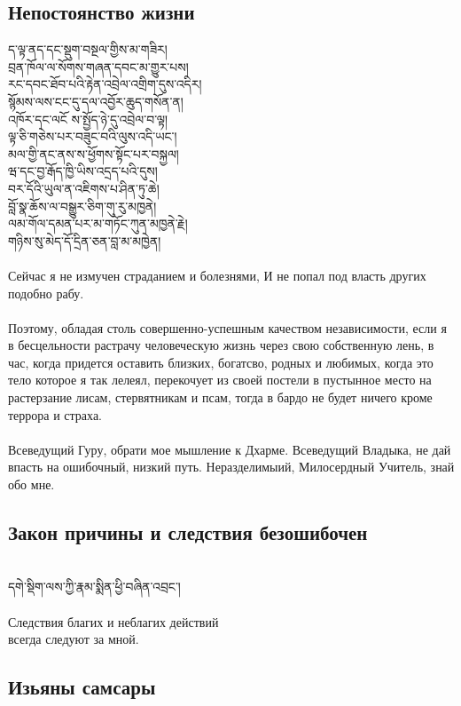 \subsection{Непостоянство жизни}
\ti
ད་ལྟ་ནད་དང་སྡུག་བསྔལ་གྱིས་མ་གཟིར།\\
བྲན་ཁོལ་ལ་སོགས་གཞན་དབང་མ་གྱུར་པས།\\
རང་དབང་ཐོབ་པའི་རྟེན་འབྲེལ་འགྲིག་དུས་འདིར།\\
སྙོམས་ལས་ངང་དུ་དལ་འབྱོར་ཆུད་གསོན་ན།\\
འཁོར་དང་ལངོ ས་སྤྱོད་ཉེ་དུ་འབྲེལ་བ་ལྟ།\\
ལྟ་ཅི་གཅེས་པར་བཟུང་བའི་ལུས་འདི་ཡང་།\\
མལ་གྱི་ནང་ནས་ས་ཕྱོགས་སྟོང་པར་བསྐྱལ།\\
ཝ་དང་བྱ་རྒོད་ཁྱི་ཡིས་འདྲད་པའི་དུས།\\
བར་དོའི་ཡུལ་ན་འཇིགས་པ་ཤིན་ཏུ་ཆེ།\\
བློ་སྣ་ཆོས་ལ་བསྒྱུར་ཅིག་གུ་རུ་མཁྱནེ།\\
ལམ་གོལ་དམན་པར་མ་གཏོང་ཀུན་མཁྱནེ་རྗེ།\\
གཉིས་སུ་མེད་དོ་དྲིན་ཅན་བླ་མ་མཁྱེན།\\
\\
\ru
Сейчас я не измучен страданием и болезнями,
И не попал под власть других подобно рабу.\\
\\
Поэтому, обладая столь совершенно-успешным качеством не\-зависимости,
если я в бесцельности растрачу человеческую жи\-знь через свою собственную лень,
в час, когда придется оста\-вить близких, богатсво, родных и любимых,
когда это тело которое я так лелеял,
перекочует из своей постели в пустынное место
на растерзание лисам, стервятникам и псам,
тогда в бардо не будет ничего кроме террора и страха.\\
\\
Всеведущий Гуру, обрати мое мышление к Дхарме.
Всеведущий Владыка, не дай впасть на ошибочный, низкий путь.
Нераздели\-мыий, Милосердный Учитель, знай обо мне.

\newpage
\subsection{Закон причины и следствия безошибочен}
\\
\ti
དགེ་སྡིག་ལས་ཀྱི་རྣམ་སྨིན་ཕྱི་བཞིན་འབྲང་།\\
\\
\ru
Следствия благих и неблагих действий \\ \indent всегда следуют за мной.

\subsection{Изьяны самсары}

